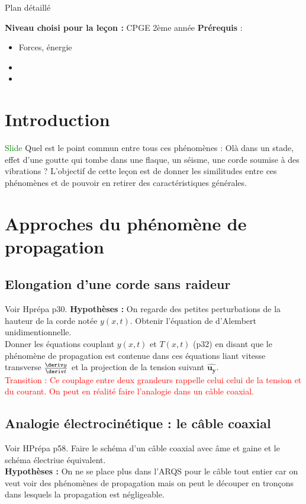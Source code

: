 \begin{reportBlock}{Plan détaillé}

  \textbf{Niveau choisi pour la leçon :} CPGE 2ème année
  \newline
  \textbf{Prérequis} : \begin{itemize}
      \item Forces, énergie
      \item 
      \item 
  \end{itemize}
  
  \section*{Introduction}
\textcolor{green}{Slide} Quel est le point commun entre tous ces phénomènes : Olà dans un stade, effet d'une goutte qui tombe dans une flaque, un séisme, une corde soumise à des vibrations ? L'objectif de cette leçon est de donner les similitudes entre ces phénomènes et de pouvoir en retirer des caractéristiques générales.

  \section{Approches du phénomène de propagation}

  \subsection{Elongation d'une corde sans raideur}
  Voir Hprépa p30.
  \textbf{Hypothèses :} On regarde des petites perturbations de la hauteur de la corde notée $y(x,t)$. 
  Obtenir l'équation de d'Alembert unidimentionnelle.\\
  
  Donner les équations couplant $y(x,t)$ et $T(x,t)$ (p32) en disant que le phénomène de propagation est contenue dans ces équations liant vitesse transverse $\fracD{y}{t}$ et la projection de la tension suivant $\mathbf{\hat{u_y}}$.\\

  \textcolor{red}{Transition : Ce couplage entre deux grandeurs rappelle celui celui de la tension et du courant. On peut en réalité faire l'analogie dans un câble coaxial.}

  \subsection{Analogie électrocinétique : le câble coaxial} 
  Voir HPrépa p58. Faire le schéma d'un câble coaxial avec âme et gaine et le schéma électriue équivalent.\\
  \textbf{Hypothèses :} On ne se place plus dans l'ARQS pour le câble tout entier car on veut voir des phénomènes de propagation mais on peut le découper en tronçons dans lesquels la propagation est négligeable. \\
  

\end{reportBlock}
